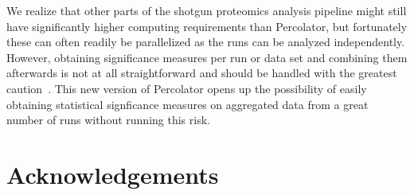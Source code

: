 \documentclass{article}
\begin{document}
We realize that other parts of the shotgun proteomics analysis
pipeline might still have significantly higher computing requirements
than Percolator, but fortunately these can often readily be
parallelized as the runs can be analyzed independently. However,
obtaining significance measures per run or data set and combining them
afterwards is not at all straightforward and should be handled with
the greatest caution~\cite{serang2015solution}. This new version of
Percolator opens up the possibility of easily obtaining statistical
signficance measures on aggregated data from a great number of runs
without running this risk.

\section*{Acknowledgements}


{} 

\end{document}
